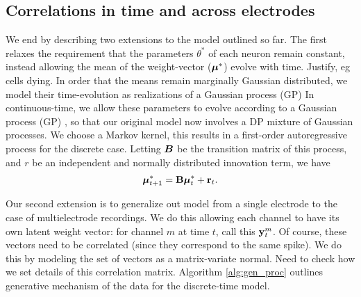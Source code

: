 \subsection{Correlations in time and across electrodes}
We end by describing two extensions to the model outlined so far. 
The first relaxes the requirement that the parameters $\theta^*$ of each neuron remain constant, instead allowing the mean of the weight-vector ($\boldsymbol{\mu}^*$)
evolve with time.  {\color{green} Justify, eg cells dying}. 
In order that the means remain marginally Gaussian distributed, we model their time-evolution as realizations of a Gaussian process (GP) \citep{RasWil2006}
In continuous-time, we allow these parameters to evolve according to a Gaussian process (GP) \citep{}, so that our original model now involves a DP mixture 
of Gaussian processes.
We choose a Markov kernel, this results in a first-order autoregressive process for the discrete case. Letting $\boldsymbol{B}$ be the transition matrix of this
process, 
and $r$ be an independent and normally distributed innovation term, we have
\begin{align}
  \boldsymbol{\mu}^*_{t+1} = \mathbf{B} \boldsymbol{\mu}^*_t + \mathbf{r}_t.
\end{align}

Our second extension is to generalize out model from a single electrode to the case of multielectrode recordings. 
We do this allowing each channel to have its own latent weight vector: for channel $m$ at time $t$, call this $\mathbf{y}^m_t$.
Of course, these vectors need to be correlated (since they correspond to the same spike). We do this by modeling the set of
vectors as a matrix-variate normal.
{\color{green} Need to check how we set details of this correlation matrix}.
Algorithm \ref{alg:gen_proc} outlines generative mechanism of the data for the discrete-time model.

